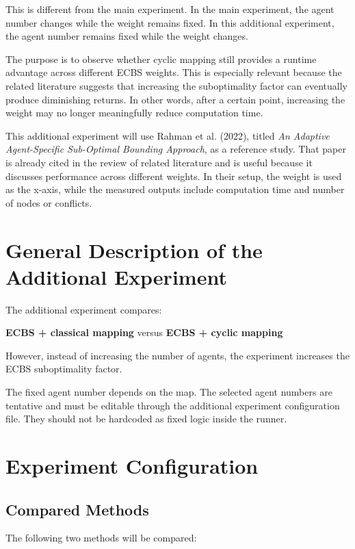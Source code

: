 \documentclass[11pt,a4paper]{article}
\begin{document}
This is different from the main experiment. In the main experiment, the agent number changes while the weight remains fixed. In this additional experiment, the agent number remains fixed while the weight changes.

The purpose is to observe whether cyclic mapping still provides a runtime advantage across different ECBS weights. This is especially relevant because the related literature suggests that increasing the suboptimality factor can eventually produce diminishing returns. In other words, after a certain point, increasing the weight may no longer meaningfully reduce computation time.

This additional experiment will use Rahman et al. (2022), titled \textit{An Adaptive Agent-Specific Sub-Optimal Bounding Approach}, as a reference study. That paper is already cited in the review of related literature and is useful because it discusses performance across different weights. In their setup, the weight is used as the x-axis, while the measured outputs include computation time and number of nodes or conflicts.

\section*{General Description of the Additional Experiment}

The additional experiment compares:

\begin{center}
\textbf{ECBS + classical mapping}
\quad versus \quad
\textbf{ECBS + cyclic mapping}
\end{center}

However, instead of increasing the number of agents, the experiment increases the ECBS suboptimality factor.

The fixed agent number depends on the map. The selected agent numbers are tentative and must be editable through the additional experiment configuration file. They should not be hardcoded as fixed logic inside the runner.

\section*{Experiment Configuration}

\subsection*{Compared Methods}

The following two methods will be compared:
\end{document}
